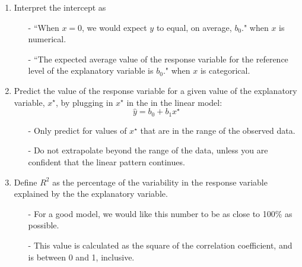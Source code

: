 \documentclass[11pt]{article}
\begin{document}
\begin{enumerate}[resume]
\item Interpret the intercept as
\begin{itemize}
\item[-] ``When $x = 0$, we would expect $y$ to equal, on average, $b_0$." when $x$ is numerical.
\item[-] ``The expected average value of the response variable for the reference level of the explanatory variable is $b_0$." when $x$ is categorical.
\end{itemize}

\item Predict the value of the response variable for a given value of the explanatory variable, $x^\star$, by plugging in $x^\star$ in the in the linear model:
\[ \hat{y} = b_0 + b_1 x^\star \]
\begin{itemize}
\item[-] Only predict for values of $x^\star$ that are in the range of the observed data.
\item[-] Do not extrapolate beyond the range of the data, unless you are confident that the linear pattern continues.
\end{itemize}

\item Define $R^2$ as the percentage of the variability in the response variable explained by the the explanatory variable.
\begin{itemize}
\item[-] For a good model, we would like this number to be as close to 100\% as possible.
\item[-] This value is calculated as the square of the correlation coefficient, and is between 0 and 1, inclusive.
\end{itemize}

\end{enumerate}
\end{document}
